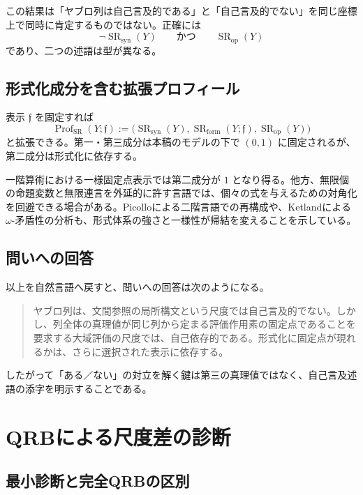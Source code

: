 \documentclass[a4paper,11pt]{ltjsarticle}
\theoremstyle{definition}
\theoremstyle{plain}
\newcommand{\SR}{\operatorname{SR}}
\newcommand{\Prof}{\operatorname{Prof}}
\begin{document}
この結果は「ヤブロ列は自己言及的である」と「自己言及的でない」を同じ座標上で同時に肯定するものではない。正確には
\begin{equation}
 \neg\SR_{\mathrm{syn}}(Y)
 \qquad\text{かつ}\qquad
 \SR_{\mathrm{op}}(Y)
\end{equation}
であり、二つの述語は型が異なる。

\subsection{形式化成分を含む拡張プロフィール}

表示 $\mathfrak f$ を固定すれば
\begin{equation}
 \Prof_{\SR}(Y;\mathfrak f)
 :=
 \bigl(
 \SR_{\mathrm{syn}}(Y),
 \SR_{\mathrm{form}}(Y;\mathfrak f),
 \SR_{\mathrm{op}}(Y)
 \bigr)
 \label{eq:extended-profile}
\end{equation}
と拡張できる。第一・第三成分は本稿のモデルの下で $(0,1)$ に固定されるが、第二成分は形式化に依存する。

一階算術における一様固定点表示では第二成分が $1$ となり得る。他方、無限個の命題変数と無限連言を外延的に許す言語では、個々の式を与えるための対角化を回避できる場合がある。Picolloによる二階言語での再構成や、Ketlandによる $\omega$-矛盾性の分析も、形式体系の強さと一様性が帰結を変えることを示している\cite{Picollo2012Yablo,Ketland2005Yablo}。

\subsection{問いへの回答}

以上を自然言語へ戻すと、問いへの回答は次のようになる。
\begin{quote}
ヤブロ列は、文間参照の局所構文という尺度では自己言及的でない。しかし、列全体の真理値が同じ列から定まる評価作用素の固定点であることを要求する大域評価の尺度では、自己依存的である。形式化に固定点が現れるかは、さらに選択された表示に依存する。
\end{quote}

したがって「ある／ない」の対立を解く鍵は第三の真理値ではなく、自己言及述語の添字を明示することである。

\section{QRBによる尺度差の診断}

\subsection{最小診断と完全QRBの区別}
\end{document}
